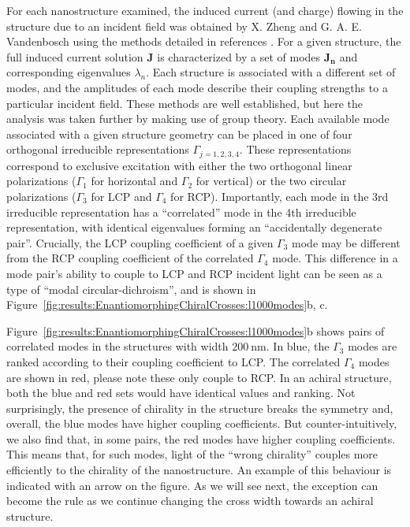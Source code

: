 \begin{figure}[htb!]
\end{figure}

For each nanostructure examined, the induced current (and charge) flowing in the structure due to an incident field was obtained by X. Zheng and G. A. E. Vandenbosch using the methods detailed in references \cite{Collins2018, Zheng2012}. For a given structure, the full induced current solution $\mathbf{J}$ is characterized by a set of modes $\mathbf{J_n}$ and corresponding eigenvalues $\lambda_{n}$. Each structure is associated with a different set of modes, and the amplitudes of each mode describe their coupling strengths to a particular incident field.
These methods are well established, but here the analysis was taken further by making use of group theory. Each available mode associated with a given structure geometry can be placed in one of four orthogonal irreducible representations $\Gamma _{j = 1,2,3,4}$. These representations correspond to exclusive excitation with either the two orthogonal linear polarizations ($\Gamma _{1}$ for horizontal and $\Gamma _{2}$ for vertical) or the two circular polarizations ($\Gamma _{3}$ for LCP and $\Gamma _{4}$ for RCP). 
Importantly, each mode in the 3rd irreducible representation has a “correlated” mode in the 4th irreducible representation, with identical eigenvalues forming an ``accidentally degenerate pair''. 
Crucially, the LCP coupling coefficient of a given $\Gamma _{3}$ mode may be different from the RCP coupling coefficient of the correlated $\Gamma _{4}$ mode. 
This difference in a mode pair’s ability to couple to LCP and RCP incident light can be seen as a type of “modal circular-dichroism”, and is shown in Figure~\ref{fig:results:EnantiomorphingChiralCrosses:l1000modes}b, c. 

Figure~\ref{fig:results:EnantiomorphingChiralCrosses:l1000modes}b shows pairs of correlated modes in the structures with width $\SI{200}{\nano\m}$. In blue, the $\Gamma _{3}$ modes are ranked according to their coupling coefficient to LCP. The correlated $\Gamma _{4}$ modes are shown in red, please note these only couple to RCP. In an achiral structure, both the blue and red sets would have identical values and ranking. Not surprisingly, the presence of chirality in the structure breaks the symmetry and, overall, the blue modes have higher coupling coefficients. 
But counter-intuitively, we also find that, in some pairs, the red modes have higher coupling coefficients. This means that, for such modes, light of the ``wrong chirality'' couples more efficiently to the chirality of the nanostructure. An example of this behaviour is indicated with an arrow on the figure. As we will see next, the exception can become the rule as we continue changing the cross width towards an achiral structure.


